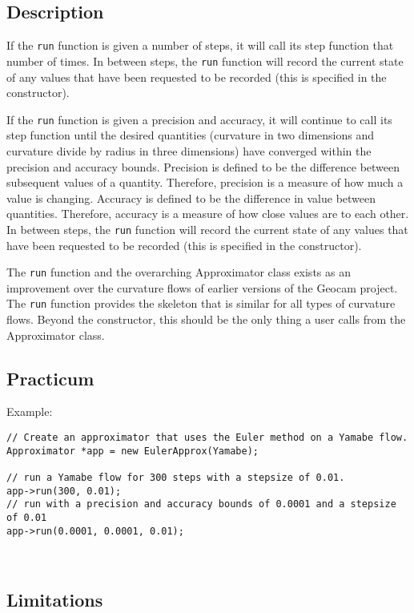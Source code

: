 \documentclass[12pt]{article}%
\begin{document}
\subsection*{Description} \label{run.description}

If the \texttt{run} function is given a number of steps, it will call its step function that number of times. In between steps, the \texttt{run} function will record the current state of any values that have been requested to be recorded (this is specified in the constructor). \	

If the \texttt{run} function is given a precision and accuracy, it will continue to call its step function until the desired quantities (curvature in two dimensions and curvature divide by radius in three dimensions) have converged within the precision and accuracy bounds. Precision is defined to be the difference between subsequent values of a quantity. Therefore, precision is a measure of how much a value is changing. Accuracy is defined to be the difference in value between quantities. Therefore, accuracy is a measure of how close values are to each other. In between steps, the \texttt{run} function will record the current state of any values that have been requested to be recorded (this is specified in the constructor). \	

The \texttt{run} function and the overarching Approximator class exists as an improvement over the curvature flows of earlier versions of the Geocam project. The \texttt{run} function provides the skeleton that is similar for all types of curvature flows. Beyond the constructor, this should be the only thing a user calls from the Approximator class.  \	

\subsection*{Practicum}

Example:
\begin{verbatim}
// Create an approximator that uses the Euler method on a Yamabe flow.
Approximator *app = new EulerApprox(Yamabe);

// run a Yamabe flow for 300 steps with a stepsize of 0.01.
app->run(300, 0.01);
// run with a precision and accuracy bounds of 0.0001 and a stepsize of 0.01
app->run(0.0001, 0.0001, 0.01);
\end{verbatim} \	

\subsection*{Limitations}
\end{document}
